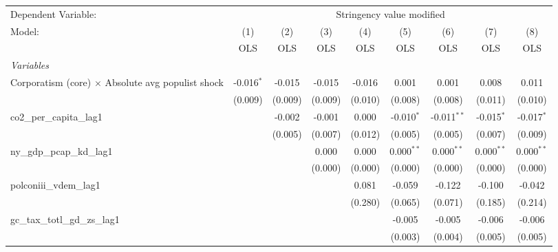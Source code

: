 
\begingroup
\centering
\begin{tabular}{lcccccccc}
   \toprule
   Dependent Variable: & \multicolumn{8}{c}{Stringency value modified}\\
   Model:                                                   & (1)          & (2)     & (3)     & (4)     & (5)          & (6)           & (7)          & (8)\\  
                                                            &  OLS         & OLS     & OLS     & OLS     & OLS          & OLS           & OLS          & OLS\\  
   \midrule
   \emph{Variables}\\
   Corporatism (core) $\times$ Absolute avg populist shock  & -0.016$^{*}$ & -0.015  & -0.015  & -0.016  & 0.001        & 0.001         & 0.008        & 0.011\\   
                                                            & (0.009)      & (0.009) & (0.009) & (0.010) & (0.008)      & (0.008)       & (0.011)      & (0.010)\\   
   co2\_per\_capita\_lag1                                   &              & -0.002  & -0.001  & 0.000   & -0.010$^{*}$ & -0.011$^{**}$ & -0.015$^{*}$ & -0.017$^{*}$\\   
                                                            &              & (0.005) & (0.007) & (0.012) & (0.005)      & (0.005)       & (0.007)      & (0.009)\\   
   ny\_gdp\_pcap\_kd\_lag1                                  &              &         & 0.000   & 0.000   & 0.000$^{**}$ & 0.000$^{**}$  & 0.000$^{**}$ & 0.000$^{**}$\\   
                                                            &              &         & (0.000) & (0.000) & (0.000)      & (0.000)       & (0.000)      & (0.000)\\   
   polconiii\_vdem\_lag1                                    &              &         &         & 0.081   & -0.059       & -0.122        & -0.100       & -0.042\\   
                                                            &              &         &         & (0.280) & (0.065)      & (0.071)       & (0.185)      & (0.214)\\   
   gc\_tax\_totl\_gd\_zs\_lag1                              &              &         &         &         & -0.005       & -0.005        & -0.006       & -0.006\\   
                                                            &              &         &         &         & (0.003)      & (0.004)       & (0.005)      & (0.005)\\   

\end{tabular}
